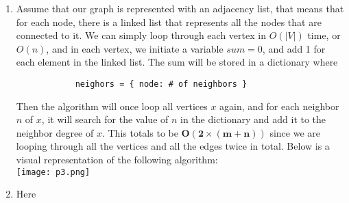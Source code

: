 \documentclass{article}
\begin{document}
\begin{enumerate}
        \item Assume that our graph is represented with an adjacency list, that means that for each node, there is a linked list that represents all the nodes that are connected to it. We can simply loop through each vertex in $O(|V|)$ time, or $O(n)$, and in each vertex, we initiate a variable $sum = 0$, and add 1 for each element in the linked list. The sum will be stored in a dictionary where
        \begin{verbatim}
            neighors = { node: # of neighbors }
        \end{verbatim}
        Then the algorithm will once loop all vertices $x$ again, and for each neighbor $n$ of $x$, it will search for the value of $n$ in the dictionary and add it to the neighbor degree of $x$. This totals to be $\boxed{\mathbf{O(2 \times (m + n))}}$ since we are looping through all the vertices and all the edges twice in total. Below is a visual representation of the following algorithm:\\
        \texttt{[image: p3.png]}
        \item Here
    \end{enumerate} 
\end{document}
